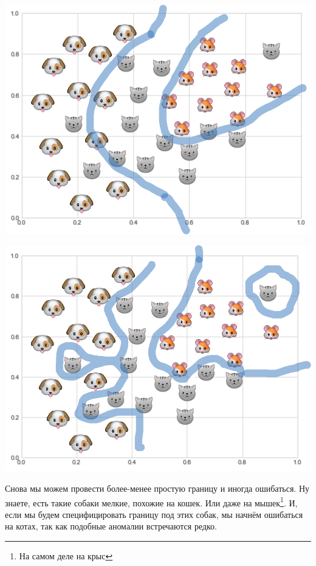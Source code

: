 \documentclass[12pt, a4paper, oneside]{article}
\theoremstyle{plain} %
\theoremstyle{definition}
\begin{document}
\begin{solution}
\begin{minipage}[t]{0.45\textwidth}
	\includegraphics[scale=0.21]{class_2_res1.png}
\end{minipage}
\hfill
\begin{minipage}[t]{0.45\textwidth}
	\includegraphics[scale=0.21]{class_2_res2.png}
\end{minipage}

Снова мы можем провести более-менее простую границу и иногда ошибаться. Ну знаете, есть такие собаки мелкие, похожие на кошек. Или даже на мышек\footnote{На самом деле на крыс}. И, если мы будем специфицировать границу под этих собак, мы начнём ошибаться на котах, так как подобные аномалии встречаются редко. 


\end{solution}
\end{document}
